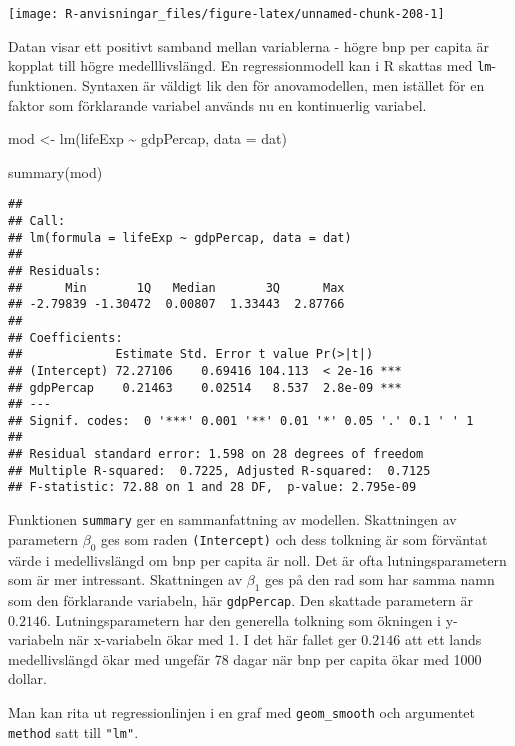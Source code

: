 \documentclass[
]{book}
\newenvironment{Shaded}{\begin{snugshade}}{\end{snugshade}}
\newcommand{\AttributeTok}[1]{\textcolor[rgb]{0.77,0.63,0.00}{#1}}
\newcommand{\FunctionTok}[1]{\textcolor[rgb]{0.00,0.00,0.00}{#1}}
\newcommand{\NormalTok}[1]{#1}
\newcommand{\OtherTok}[1]{\textcolor[rgb]{0.56,0.35,0.01}{#1}}
\newcommand{\SpecialCharTok}[1]{\textcolor[rgb]{0.00,0.00,0.00}{#1}}
\theoremstyle{definition}
\theoremstyle{definition}
\theoremstyle{definition}
\theoremstyle{definition}
\theoremstyle{remark}
\begin{document}
\begin{center}\texttt{[image: R-anvisningar\_files/figure-latex/unnamed-chunk-208-1]} \end{center}

Datan visar ett positivt samband mellan variablerna - högre bnp per capita är kopplat till högre medelllivslängd. En regressionmodell kan i R skattas med \texttt{lm}-funktionen. Syntaxen är väldigt lik den för anovamodellen, men istället för en faktor som förklarande variabel används nu en kontinuerlig variabel.

\begin{Shaded}
\begin{Highlighting}[]
\NormalTok{mod }\OtherTok{\textless{}{-}} \FunctionTok{lm}\NormalTok{(lifeExp }\SpecialCharTok{\textasciitilde{}}\NormalTok{ gdpPercap, }\AttributeTok{data =}\NormalTok{ dat)}

\FunctionTok{summary}\NormalTok{(mod)}
\end{Highlighting}
\end{Shaded}

\begin{verbatim}
## 
## Call:
## lm(formula = lifeExp ~ gdpPercap, data = dat)
## 
## Residuals:
##      Min       1Q   Median       3Q      Max 
## -2.79839 -1.30472  0.00807  1.33443  2.87766 
## 
## Coefficients:
##             Estimate Std. Error t value Pr(>|t|)    
## (Intercept) 72.27106    0.69416 104.113  < 2e-16 ***
## gdpPercap    0.21463    0.02514   8.537  2.8e-09 ***
## ---
## Signif. codes:  0 '***' 0.001 '**' 0.01 '*' 0.05 '.' 0.1 ' ' 1
## 
## Residual standard error: 1.598 on 28 degrees of freedom
## Multiple R-squared:  0.7225, Adjusted R-squared:  0.7125 
## F-statistic: 72.88 on 1 and 28 DF,  p-value: 2.795e-09
\end{verbatim}

Funktionen \texttt{summary} ger en sammanfattning av modellen. Skattningen av parametern \(\beta_0\) ges som raden \texttt{(Intercept)} och dess tolkning är som förväntat värde i medellivslängd om bnp per capita är noll. Det är ofta lutningsparametern som är mer intressant. Skattningen av \(\beta_1\) ges på den rad som har samma namn som den förklarande variabeln, här \texttt{gdpPercap}. Den skattade parametern är \(0.2146\). Lutningsparametern har den generella tolkning som ökningen i y-variabeln när x-variabeln ökar med 1. I det här fallet ger \(0.2146\) att ett lands medellivslängd ökar med ungefär 78 dagar när bnp per capita ökar med 1000 dollar.

Man kan rita ut regressionlinjen i en graf med \texttt{geom\_smooth} och argumentet \texttt{method} satt till \texttt{"lm"}.
\end{document}
